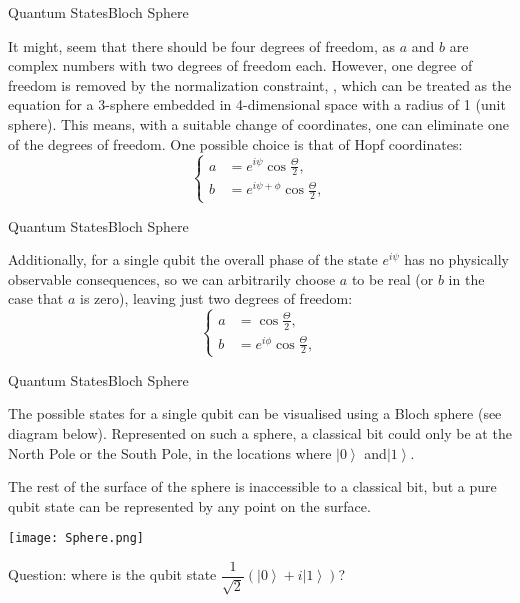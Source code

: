 \documentclass[UTF8,beamer,serif,ctexart]{beamer}
\begin{document}
\begin{frame}{Quantum States}{Bloch Sphere}
\par It might, seem that there should be four degrees of freedom, as $a$ and $b$ are complex numbers with two degrees of freedom each. However, one degree of freedom is removed by the normalization constraint, , which can be treated as the equation for a 3-sphere embedded in 4-dimensional space with a radius of 1 (unit sphere). This means, with a suitable change of coordinates, one can eliminate one of the degrees of freedom. One possible choice is that of Hopf coordinates:
\begin{equation}
\left\{
\begin{aligned}
a & = e^{i\psi}\cos\frac{\Theta}{2},	\\
b & = e^{i\psi+\phi}\cos\frac{\Theta}{2},
\end{aligned}
\right.
\end {equation}	
\end{frame}

\begin{frame}{Quantum States}{Bloch Sphere}
	\par Additionally, for a single qubit the overall phase of the state $e^{i\psi}$ has no physically observable consequences, so we can arbitrarily choose $a$ to be real (or $b$ in the case that $a$ is zero), leaving just two degrees of freedom:
	\begin{equation}
		\left\{
		\begin{aligned}
			a & = \cos\frac{\Theta}{2},	\\
			b & = e^{i\phi}\cos\frac{\Theta}{2},
		\end{aligned}
		\right.
	\end {equation}	
\end{frame}

\begin{frame}{Quantum States}{Bloch Sphere}
	\par The possible states for a single qubit can be visualised using a Bloch sphere (see diagram below). Represented on such a sphere, a classical bit could only be at the North Pole or the South Pole, in the locations where $\left| 0 \right\rangle$ and$\left| 1 \right\rangle$.
	\par The rest of the surface of the sphere is inaccessible to a classical bit, but a pure qubit state can be represented by any point on the surface. 
	\par \texttt{[image: Sphere.png]}
	\par Question: where is the qubit state $\dfrac{1}{\sqrt{2}}(\left|0\right\rangle+i\left|1\right\rangle)$?
\end{frame}
\end{document}
